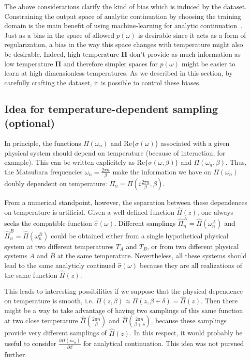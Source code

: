 \documentclass[notitlepage,11pt,nofootinbib]{revtex4-1}
\renewcommand{\vec}[1]{\bm{#1}}
\begin{document}
The above considerations clarify the kind of bias which is induced by the dataset. Constraining the output space of analytic continuation by choosing the training domain is the main benefit of using machine-learning for analytic continuation~\cite{Arsenault2017}. Just as a bias in the space of allowed $p(\omega)$ is desirable since it acts as a form of regularization, a bias in the way this space changes with temperature might also be desirable. Indeed, high temperature $\vec \Pi$ don't provide as much information as low temperature $\vec \Pi$ and therefore simpler spaces for $p(\omega)$ might be easier to learn at high dimensionless temperatures. As we described in this section, by carefully crafting the dataset, it is possible to control these biases.






\subsection{Idea for temperature-dependent sampling (optional)}

In principle, the functions $\Pi(\omega_n)$ and $\text{Re}\{\sigma(\omega)\}$ associated with a given physical system should depend on temperature (because of interaction, for example). This can be written explicitely as $\text{Re}\{\sigma(\omega, \beta)\}$ and $\Pi(\omega_n, \beta)$. Thus, the Matsubara frequencies $\omega_n = \frac{2\pi n}{\beta}$ make the information we have on $\Pi(\omega_n)$ doubly dependent on temperature: $\Pi_n = \Pi(i\frac{2\pi n}{\beta}, \beta)$.

From a numerical standpoint, however, the separation between these dependences on temperature is artificial. Given a well-defined function $\hat{\Pi}(z)$, one always seeks the compatible function $\hat{\sigma}(\omega)$. Different samplings $\hat{\Pi}^{A}_n = \hat{\Pi}(\omega^A_n)$ and $\hat{\Pi}^{B}_n = \hat{\Pi}(\omega^B_n)$ could be obtained either from a single hypothetical physical system at two different temperatures $T_A$ and $T_B$, or from two different physical systems $A$ and $B$ at the same temperature. Nevertheless, all these systems should lead to the same analyticly continued $\hat{\sigma}(\omega)$ because they are all realizations of the same function $\hat{\Pi}(z)$.

This leads to interesting possibilities if we suppose that the physical dependence on temperature is smooth, i.e. $\Pi(z,\beta)\approx \Pi(z,\beta+\delta) = \hat{\Pi}(z)$. Then there might be a way to take advantage of having two samplings of this same function at two close temperature $\hat{\Pi}(\frac{2\pi n}{\beta})$ and $\hat{\Pi}(\frac{2\pi n}{\beta+\delta})$, because these samplings provide very different samplings of $\hat{\Pi}(z)$. In this respect, it would probably be useful to consider $\frac{\partial\Pi(i\omega_n)}{\partial \beta}$ for analytical continuation. This idea was not pursued further.
\end{document}
